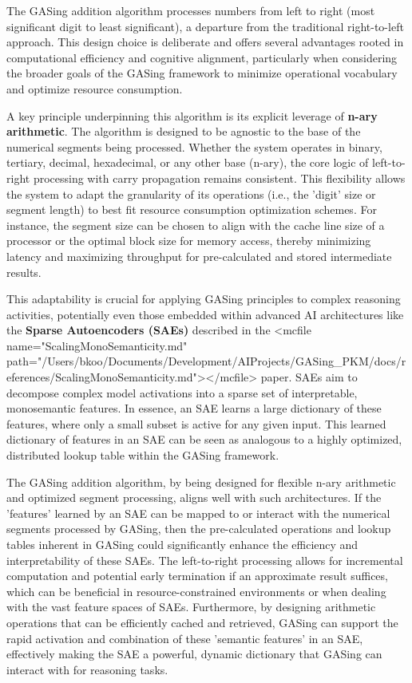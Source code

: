 The GASing addition algorithm processes numbers from left to right (most significant digit to least significant), a departure from the traditional right-to-left approach. This design choice is deliberate and offers several advantages rooted in computational efficiency and cognitive alignment, particularly when considering the broader goals of the GASing framework to minimize operational vocabulary and optimize resource consumption.

A key principle underpinning this algorithm is its explicit leverage of \textbf{n-ary arithmetic}. The algorithm is designed to be agnostic to the base of the numerical segments being processed. Whether the system operates in binary, tertiary, decimal, hexadecimal, or any other base (n-ary), the core logic of left-to-right processing with carry propagation remains consistent. This flexibility allows the system to adapt the granularity of its operations (i.e., the 'digit' size or segment length) to best fit resource consumption optimization schemes. For instance, the segment size can be chosen to align with the cache line size of a processor or the optimal block size for memory access, thereby minimizing latency and maximizing throughput for pre-calculated and stored intermediate results.

This adaptability is crucial for applying GASing principles to complex reasoning activities, potentially even those embedded within advanced AI architectures like the \textbf{Sparse Autoencoders (SAEs)} described in the <mcfile name="ScalingMonoSemanticity.md" path="/Users/bkoo/Documents/Development/AIProjects/GASing_PKM/docs/references/ScalingMonoSemanticity.md"></mcfile> paper. SAEs aim to decompose complex model activations into a sparse set of interpretable, monosemantic features. In essence, an SAE learns a large dictionary of these features, where only a small subset is active for any given input. This learned dictionary of features in an SAE can be seen as analogous to a highly optimized, distributed lookup table within the GASing framework. 

The GASing addition algorithm, by being designed for flexible n-ary arithmetic and optimized segment processing, aligns well with such architectures. If the 'features' learned by an SAE can be mapped to or interact with the numerical segments processed by GASing, then the pre-calculated operations and lookup tables inherent in GASing could significantly enhance the efficiency and interpretability of these SAEs. The left-to-right processing allows for incremental computation and potential early termination if an approximate result suffices, which can be beneficial in resource-constrained environments or when dealing with the vast feature spaces of SAEs. Furthermore, by designing arithmetic operations that can be efficiently cached and retrieved, GASing can support the rapid activation and combination of these 'semantic features' in an SAE, effectively making the SAE a powerful, dynamic dictionary that GASing can interact with for reasoning tasks.

